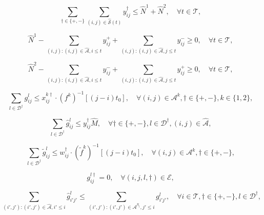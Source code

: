 \documentclass[10pt, reqno]{amsart}
\begin{document}
\begin{equation}
\sum_{\dagger \in \{+,-\}} \sum_{(i,j) \in \hat{\mathcal{S}}(t)} y_{ij}^{\dagger} \le \hat{N}^1 + \hat{N}^2, \quad \forall t \in \mathcal{T},\label{m2:num auto veh}
\end{equation}

\begin{equation}
 \hat{N}^1-\sum_{(i,j) : (i,j) \in \hat{\mathcal{A}}, i \le t} y_{ij}^+ + \sum_{(i,j) : (i,j) \in \hat{\mathcal{A}}, j \le t} y_{ij}^- \ge 0, \quad \forall t \in \mathcal{T},\label{m2:bal auto +}
\end{equation}

\begin{equation}
 \hat{N}^2-\sum_{(i,j) : (i,j) \in \hat{\mathcal{A}}, i \le t} y_{ij}^- + \sum_{(i,j) : (i,j) \in \hat{\mathcal{A}}, j \le t} y_{ij}^+  \ge 0, \quad \forall t \in \mathcal{T},\label{m2:bal auto -}
\end{equation}

\begin{equation}
\sum_{l \in \mathcal{D}^{\dagger}} g_{ij}^l \le x_{ij}^{k\dagger} \cdot (f^k)^{-1} [(j-i) t_0], \quad \forall (i,j) \in \mathcal{A}^k, \dagger \in \{+,-\}, k \in \{1,2\},\label{m2:BHH}
\end{equation}

\begin{equation}
\sum_{l\in\mathcal{D}^{\dagger}}\hat{g}_{ij}^l \le y_{ij}^{\dagger} \hat{M}, \quad \forall \dagger \in \{+,-\}, l \in \mathcal{D}^{\dagger}, (i,j) \in \hat{\mathcal{A}},\label{m2:auto vol}
\end{equation}

\begin{equation}
\sum_{l \in \mathcal{D}^{\dagger}} \tilde{g}_{ij}^l \le w_{ij}^{\dagger} \cdot (\tilde{f}^k)^{-1} [(j-i) t_0], \quad \forall (i,j) \in \mathcal{A}^k, \dagger \in \{+,-\},\label{m2:direct BHH}
\end{equation}

\begin{equation}
g_{ij}^{l\dagger} = 0, \quad \forall (i,j,l,\dagger) \in \mathcal{E},\label{    m2:violate}
\end{equation}

\begin{equation}
\sum_{(i',j') : (i',j') \in \hat{\mathcal{A}}, i' \le i} \hat{g}_{i'j'}^l \le \sum_{(i',j') : (i',j') \in \mathcal{A}^{\eta_{\dagger}}, j' \le i} g_{i'j'}^l, \quad \forall i \in \mathcal{T}, \dagger \in \{+,-\}, l \in \mathcal{D}^{\dagger},\label{m2:transfer step 1}
\end{equation}
\end{document}
